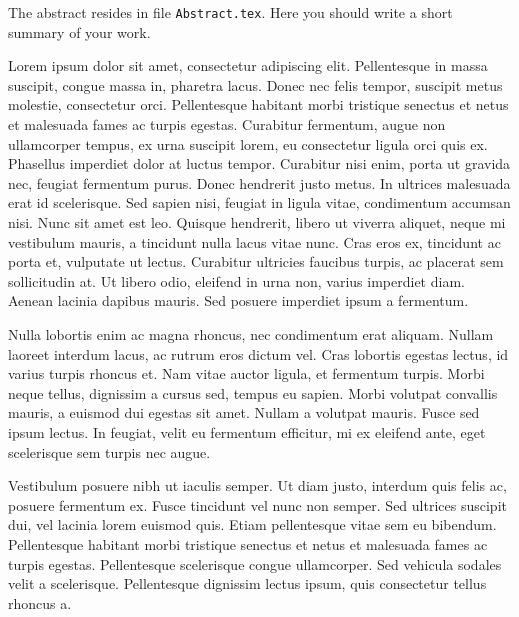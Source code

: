 
The abstract resides in file \texttt{Abstract.tex}. Here you should
write a short summary of your work.

Lorem ipsum dolor sit amet, consectetur adipiscing elit. Pellentesque
in massa suscipit, congue massa in, pharetra lacus. Donec nec felis
tempor, suscipit metus molestie, consectetur orci. Pellentesque
habitant morbi tristique senectus et netus et malesuada fames ac
turpis egestas. Curabitur fermentum, augue non ullamcorper tempus, ex
urna suscipit lorem, eu consectetur ligula orci quis ex. Phasellus
imperdiet dolor at luctus tempor. Curabitur nisi enim, porta ut
gravida nec, feugiat fermentum purus. Donec hendrerit justo metus. In
ultrices malesuada erat id scelerisque. Sed sapien nisi, feugiat in
ligula vitae, condimentum accumsan nisi. Nunc sit amet est
leo. Quisque hendrerit, libero ut viverra aliquet, neque mi vestibulum
mauris, a tincidunt nulla lacus vitae nunc. Cras eros ex, tincidunt ac
porta et, vulputate ut lectus. Curabitur ultricies faucibus turpis, ac
placerat sem sollicitudin at. Ut libero odio, eleifend in urna non,
varius imperdiet diam. Aenean lacinia dapibus mauris. Sed posuere
imperdiet ipsum a fermentum.

Nulla lobortis enim ac magna rhoncus, nec condimentum erat
aliquam. Nullam laoreet interdum lacus, ac rutrum eros dictum
vel. Cras lobortis egestas lectus, id varius turpis rhoncus et. Nam
vitae auctor ligula, et fermentum turpis. Morbi neque tellus,
dignissim a cursus sed, tempus eu sapien. Morbi volutpat convallis
mauris, a euismod dui egestas sit amet. Nullam a volutpat
mauris. Fusce sed ipsum lectus. In feugiat, velit eu fermentum
efficitur, mi ex eleifend ante, eget scelerisque sem turpis nec augue.

Vestibulum posuere nibh ut iaculis semper. Ut diam justo, interdum
quis felis ac, posuere fermentum ex. Fusce tincidunt vel nunc non
semper. Sed ultrices suscipit dui, vel lacinia lorem euismod
quis. Etiam pellentesque vitae sem eu bibendum. Pellentesque habitant
morbi tristique senectus et netus et malesuada fames ac turpis
egestas. Pellentesque scelerisque congue ullamcorper. Sed vehicula
sodales velit a scelerisque. Pellentesque dignissim lectus ipsum, quis
consectetur tellus rhoncus a.

